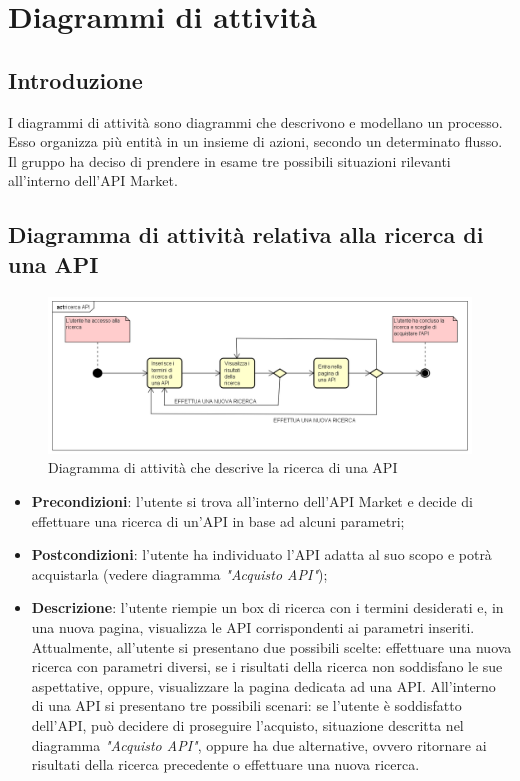 \newpage
\section{Diagrammi di attività}
\subsection{Introduzione}
I diagrammi di attività sono diagrammi che descrivono e modellano un processo. Esso organizza più entità in un insieme di azioni, secondo un determinato flusso.
Il gruppo ha deciso di prendere in esame tre possibili situazioni rilevanti all'interno dell'API Market.

\subsection{Diagramma di attività relativa alla ricerca di una API}
\begin{figure} [H]
	\centering
	\includegraphics[width=1.0\linewidth]{"IMG/ricerca API"}
	\caption{Diagramma di attività che descrive la ricerca di una API}
\end{figure}
\begin{itemize}
	\item \textbf{Precondizioni}: l'utente si trova all'interno dell'API Market e decide di effettuare una ricerca di un'API in base ad alcuni parametri;
	\item \textbf{Postcondizioni}: l'utente ha individuato l'API adatta al suo scopo e potrà acquistarla (vedere diagramma \textit{"Acquisto API"});
	\item \textbf{Descrizione}: l'utente riempie un box di ricerca con i termini desiderati e, in una nuova pagina, visualizza le API corrispondenti ai parametri inseriti. Attualmente, all'utente si presentano due possibili scelte: effettuare una nuova ricerca con parametri diversi, se i risultati della ricerca non soddisfano le sue aspettative, oppure, visualizzare la pagina dedicata ad una API. All'interno di una API si presentano tre possibili scenari: se l'utente è soddisfatto dell'API, può decidere di proseguire l'acquisto, situazione descritta nel diagramma \textit{"Acquisto API"}, oppure ha due alternative, ovvero ritornare ai risultati della ricerca precedente o effettuare una nuova ricerca.
\end{itemize}

